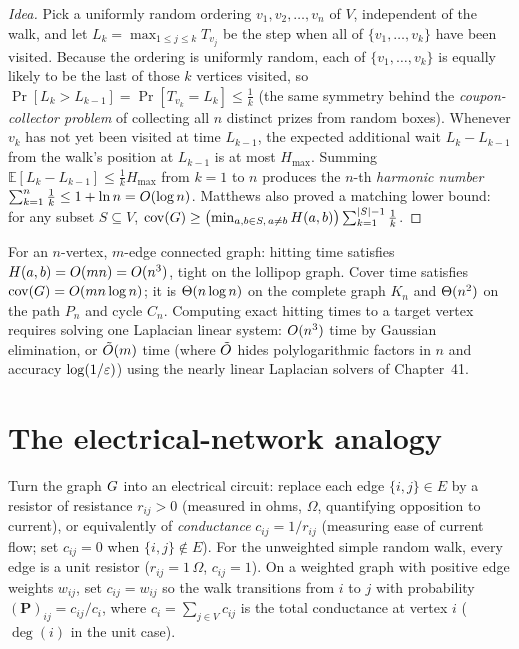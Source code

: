 \begin{proof}[Idea]
Pick a uniformly random ordering $v_1,v_2,\dots,v_n$ of $V$, independent of the walk, and let $L_k = \max_{1\le j\le k} T_{v_j}$ be the step when all of $\{v_1,\dots,v_k\}$ have been visited. Because the ordering is uniformly random, each of $\{v_1,\dots,v_k\}$ is equally likely to be the last of those $k$ vertices visited, so $\Pr[L_k > L_{k-1}] = \Pr[T_{v_k} = L_k] \le \frac{1}{k}$ (the same symmetry behind the \emph{coupon-collector problem} of collecting all $n$ distinct prizes from random boxes). Whenever $v_k$ has not yet been visited at time $L_{k-1}$, the expected additional wait $L_k - L_{k-1}$ from the walk's position at $L_{k-1}$ is at most $H_{\max}$. Summing $\mathbb{E}[L_k - L_{k-1}] \le \frac{1}{k}H_{\max}$ from $k=1$ to $n$ produces the $n$-th \emph{harmonic number} $\sum_{k=1}^n \frac{1}{k} \le 1 + \ln n = O(\log n)$. Matthews also proved a matching lower bound: for any subset $S\subseteq V$, $\operatorname{cov}(G) \ge \bigl(\min_{a,b\in S,\,a\ne b} H(a,b)\bigr)\sum_{k=1}^{\lvert S\rvert-1}\frac{1}{k}$.
\end{proof}

\begin{complexitybox}
For an $n$-vertex, $m$-edge connected graph: hitting time satisfies $H(a,b)=O(mn)=O(n^3)$, tight on the lollipop graph. Cover time satisfies $\operatorname{cov}(G)=O(mn\log n)$; it is $\Theta(n\log n)$ on the complete graph $K_n$ and $\Theta(n^2)$ on the path $P_n$ and cycle $C_n$. Computing exact hitting times to a target vertex requires solving one Laplacian linear system: $O(n^3)$ time by Gaussian elimination, or $\tilde{O}(m)$ time (where $\tilde{O}$ hides polylogarithmic factors in $n$ and accuracy $\log(1/\varepsilon)$) using the nearly linear Laplacian solvers of Chapter~41.
\end{complexitybox}

\section{The electrical-network analogy}\label{ch35:electrical}

Turn the graph $G$ into an electrical circuit: replace each edge $\{i,j\}\in E$ by a resistor of resistance $r_{ij}>0$ (measured in ohms, $\Omega$, quantifying opposition to current), or equivalently of \emph{conductance} $c_{ij}=1/r_{ij}$ (measuring ease of current flow; set $c_{ij}=0$ when $\{i,j\}\notin E$). For the unweighted simple random walk, every edge is a unit resistor ($r_{ij}=1\,\Omega$, $c_{ij}=1$). On a weighted graph with positive edge weights $w_{ij}$, set $c_{ij}=w_{ij}$ so the walk transitions from $i$ to $j$ with probability $(\mathbf{P})_{ij}=c_{ij}/c_i$, where $c_i=\sum_{j\in V} c_{ij}$ is the total conductance at vertex $i$ ($\deg(i)$ in the unit case).

